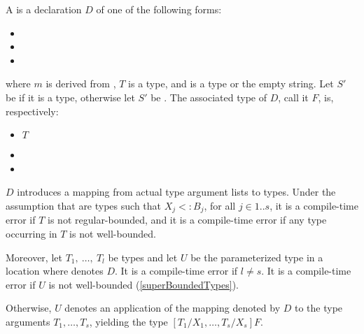 \documentclass[makeidx]{article}
\begin{document}
\LMHash{}%
A 
is a declaration $D$ of one of the following forms:

\begin{itemize}
\item {}
\item {}
\item {}
\end{itemize}

\noindent
where $m$ is derived from ,
$T$ is a type,
and  is a type or the empty string.
Let $S'$ be  if it is a type, otherwise let $S'$ be \DYNAMIC.
The associated type of $D$, call it $F$, is, respectively:

\begin{itemize}
\item $T$
\item {}
\item {}
\end{itemize}

\LMHash{}%
$D$ introduces a mapping from actual type argument lists to types.
Under the assumption that  are types such that
$X_j <: B_j$, for all $j \in 1 .. s$,
it is a compile-time error if $T$ is not regular-bounded,
and it is a compile-time error if any type occurring in $T$ is not well-bounded.


\LMHash{}%
Moreover,
let $T_1,\ \ldots,\ T_l$ be types
and let $U$ be the parameterized type 
in a location where \id{} denotes $D$.
It is a compile-time error if $l \not= s$.
It is a compile-time error if $U$ is not well-bounded
(\ref{superBoundedTypes}).

\LMHash{}%
Otherwise,
$U$ denotes an application of the mapping denoted by $D$ to the type arguments
$T_1, \ldots, T_s$,
yielding the type
$[T_1/X_1, \ldots, T_s/X_s]F$.
\end{document}
